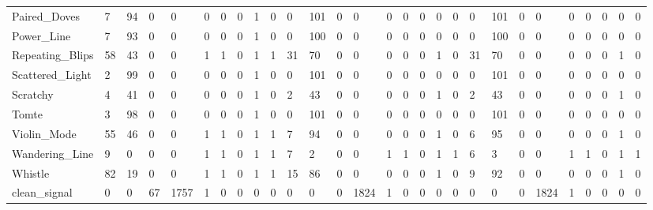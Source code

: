 \begin{tabular}{lllllrrlrrllllrrlllllllrrlll}
Paired_Doves & 7 & 94 & 0 & 0 & 0 & 0 & 0 & 1 & 0 & 0 & 101 & 0 & 0 & 0 & 0 & 0 & 0 & 0 & 0 & 101 & 0 & 0 & 0 & 0 & 0 & 0 & 0 \\
Power_Line & 7 & 93 & 0 & 0 & 0 & 0 & 0 & 1 & 0 & 0 & 100 & 0 & 0 & 0 & 0 & 0 & 0 & 0 & 0 & 100 & 0 & 0 & 0 & 0 & 0 & 0 & 0 \\
Repeating_Blips & 58 & 43 & 0 & 0 & 1 & 1 & 0 & 1 & 1 & 31 & 70 & 0 & 0 & 0 & 0 & 0 & 1 & 0 & 31 & 70 & 0 & 0 & 0 & 0 & 0 & 1 & 0 \\
Scattered_Light & 2 & 99 & 0 & 0 & 0 & 0 & 0 & 1 & 0 & 0 & 101 & 0 & 0 & 0 & 0 & 0 & 0 & 0 & 0 & 101 & 0 & 0 & 0 & 0 & 0 & 0 & 0 \\
Scratchy & 4 & 41 & 0 & 0 & 0 & 0 & 0 & 1 & 0 & 2 & 43 & 0 & 0 & 0 & 0 & 0 & 1 & 0 & 2 & 43 & 0 & 0 & 0 & 0 & 0 & 1 & 0 \\
Tomte & 3 & 98 & 0 & 0 & 0 & 0 & 0 & 1 & 0 & 0 & 101 & 0 & 0 & 0 & 0 & 0 & 0 & 0 & 0 & 101 & 0 & 0 & 0 & 0 & 0 & 0 & 0 \\
Violin_Mode & 55 & 46 & 0 & 0 & 1 & 1 & 0 & 1 & 1 & 7 & 94 & 0 & 0 & 0 & 0 & 0 & 1 & 0 & 6 & 95 & 0 & 0 & 0 & 0 & 0 & 1 & 0 \\
Wandering_Line & 9 & 0 & 0 & 0 & 1 & 1 & 0 & 1 & 1 & 7 & 2 & 0 & 0 & 1 & 1 & 0 & 1 & 1 & 6 & 3 & 0 & 0 & 1 & 1 & 0 & 1 & 1 \\
Whistle & 82 & 19 & 0 & 0 & 1 & 1 & 0 & 1 & 1 & 15 & 86 & 0 & 0 & 0 & 0 & 0 & 1 & 0 & 9 & 92 & 0 & 0 & 0 & 0 & 0 & 1 & 0 \\
clean_signal & 0 & 0 & 67 & 1757 & 1 & 0 & 0 & 0 & 0 & 0 & 0 & 0 & 1824 & 1 & 0 & 0 & 0 & 0 & 0 & 0 & 0 & 1824 & 1 & 0 & 0 & 0 & 0 \\
\bottomrule
\end{tabular}
